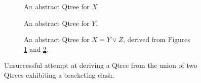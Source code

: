\begin{figure}[H]
	\centering
	\begin{subfigure}[t]{.3\linewidth}
		\centering
		\caption{An abstract Qtree for $X$}\label{fig2:qtree-y'}
	\end{subfigure}
	\hfill
	\begin{subfigure}[t]{.3\linewidth}
		\centering{}
		\caption{An abstract Qtree for $Y$.}\label{fig2:qtree-z'}
	\end{subfigure}
	\hfill
	\begin{subfigure}[t]{.3\linewidth}
		\centering{}
		\caption{An abstract Qtree for $X = Y \vee Z$, derived from Figures \ref{fig2:qtree-y'} and \ref{fig2:qtree-z'}.}\label{fig2:qtree-xy-disj-degenerate}
	\end{subfigure}
	\caption{Unsuccessful attempt at deriving a Qtree from the union of two Qtrees exhibiting a bracketing clash.}\label{fig2:qtree-x-y-z-disj-degenerate}
\end{figure}

